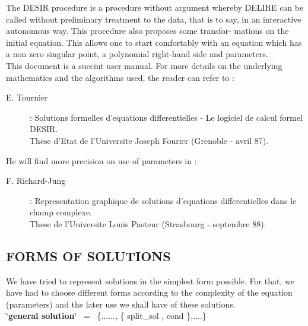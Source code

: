 The DESIR procedure is a procedure without argument whereby DELIRE can be
called without preliminary treatment to the data, that is to say, in an
interactive autonomous way. This procedure also proposes some transfor-
mations on the initial equation. This allows one to start comfortably
with an equation which has a non zero singular point, a polynomial
right-hand side and parameters. \\
This document is a succint user manual. For more details on the underlying
mathematics and the algorithms used, the reader can refer to : \\
\begin{center}
\begin{description}
\item[E. Tournier] : Solutions formelles d'equations differentielles - Le
logiciel de calcul formel DESIR. \\
These d'Etat de l'Universite Joseph Fourier (Grenoble - avril 87).
\end{description}
\end{center}

He will find more precision on use of parameters in :
\begin{center}
\begin{description}
\item[F. Richard-Jung] : Representation graphique de solutions d'equations
differentielles dans le champ complexe. \\
These de l'Universite Louis Pasteur (Strasbourg - septembre 88).
\end{description}
\end{center}

\subsection{FORMS OF SOLUTIONS}
We have tried to represent solutions in the simplest form possible. For
that, we have had to choose different forms according to the complexity
of the equation (parameters) and the later use we shall have of these
solutions. \\

\char`\"{}{\bf general solution}\char`\"{}~ =~ \{......, \{ split\_sol , cond \},....\} \\

